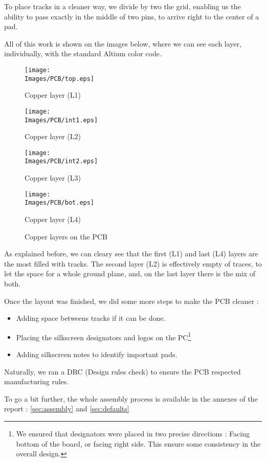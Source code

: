 To place tracks in a cleaner way, we divide by two the grid, enabling us the
ability to pass exactly in the middle of two pins, to arrive right to the
center of a pad.

All of this work is shown on the images below, where we can see each layer,
individually, with the standard Altium color code.

\begin{figure}[!hbt]
    \centering
    \begin{minipage}[c]{\SmallSchematicWidth}
        \centering
        \texttt{[image: \\Images/PCB/top.eps]}
        \caption*{Copper layer (L1)}
    \end{minipage}%
    \hfill%
    \begin{minipage}[c]{\SmallSchematicWidth}
        \centering
        \texttt{[image: \\Images/PCB/int1.eps]}
        \caption*{Copper layer (L2)}
    \end{minipage}%
    \hfill%
    \begin{minipage}[c]{\SmallSchematicWidth}
        \centering
        \texttt{[image: \\Images/PCB/int2.eps]}
        \caption*{Copper layer (L3)}
    \end{minipage}%
    \hfill%
    \begin{minipage}[c]{\SmallSchematicWidth}
        \centering
        \texttt{[image: \\Images/PCB/bot.eps]}
        \caption*{Copper layer (L4)}
    \end{minipage}
    \label{img:layout}
    \caption{Copper layers on the PCB}
\end{figure}
\FloatBarrier

As explained before, we can cleary see that the first (L1) and last (L4) layers
are the most filled with tracks. The second layer (L2) is effectively empty of
traces, to let the space for a whole ground plane, and, on the last layer there
is the mix of both.

Once the layout was finished, we did some more steps to make the PCB cleaner :

\begin{itemize}[noitemsep]
    \item   Adding space betweens tracks if it can be done.
    \item   Placing the silkscreen designators and logos on the PC\footnote{ We ensured
              that designators were placed in two precise directions : Facing bottom of the
              board, or facing right side. This ensure some consistency in the overall
              design. }
    \item   Adding silkscreen notes to identify important pads.
\end{itemize}

Naturally, we ran a DRC (Design rules check) to ensure the PCB respected
manufacturing rules.

To go a bit further, the whole assembly process is available in the annexes of
the report : \ref{sec:assembly} and \ref{sec:defaults}